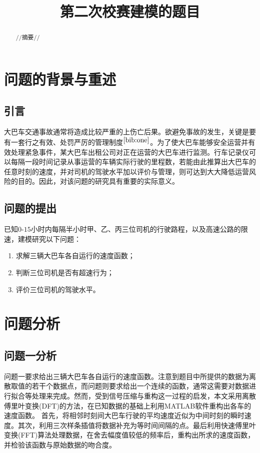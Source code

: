 \documentclass[bwprint]{cumcmthesis}
\title{第二次校赛建模的题目}
\begin{document}
    \maketitle
    \begin{abstract}
    //摘要//
    \end{abstract}
    \section{问题的背景与重述}
        \subsection{引言}
        大巴车交通事故通常将造成比较严重的上伤亡后果。欲避免事故的发生，关键是要有一套行之有效、处罚严厉的管理制度$^{\cite{bib:one}}$。为了使大巴车能够安全运营并有效处理紧急事件，某大巴车出租公司对正在运营的大巴车进行监测。行车记录仪可以每隔一段时间记录从事运营的车辆实际行驶的里程数，若能由此推算出大巴车的任意时刻的速度，并对司机的驾驶水平加以评价与管理，则可达到大大降低运营风险的目的。因此，对该问题的研究具有重要的实际意义。
        \subsection{问题的提出}
        已知$0$-$15$小时内每隔半小时甲、乙、丙三位司机的行驶路程，以及高速公路的限速，建模研究以下问题：
        \begin{enumerate}
            \item 求解三辆大巴车各自运行的速度函数；
            \item 判断三位司机是否有超速行为；
            \item 评价三位司机的驾驶水平。
        \end{enumerate}
    \section{问题分析}
        \subsection{问题一分析}
        问题一要求给出三辆大巴车各自运行的速度函数。注意到题目中所提供的数据为离散取值的若干个数据点，而问题则要求给出一个连续的函数，通常这需要对数据进行拟合等处理来完成。然而，受到信号压缩与重构这一过程的启发，本文采用离散傅里叶变换(DFT)的方法，在已知数据的基础上利用MATLAB软件重构出各车的速度函数。
        首先，将相邻时刻间大巴车行驶的平均速度近似为中间时刻的瞬时速度。其次，利用三次样条插值将数据补充为等时间间隔的点。最后利用快速傅里叶变换(FFT)算法处理数据，在舍去幅度值较低的频率后，重构出所求的速度函数，并检验该函数与原始数据的吻合度。
\end{document}
